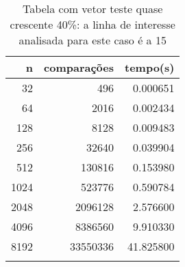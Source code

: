 \begin{table}[ht]
\centering
\begin{tabular}{rrr} \toprule
        n &    comparações &       tempo(s) \\ \midrule
      32  &            496 &      0.000651 \\
      64  &           2016 &      0.002434 \\
     128  &           8128 &      0.009483 \\
     256  &          32640 &      0.039904 \\
     512  &         130816 &      0.153980 \\
    1024  &         523776 &      0.590784 \\
    2048  &        2096128 &      2.576600 \\
    4096  &        8386560 &      9.910330 \\
    8192  &       33550336 &     41.825800 \\
\bottomrule\addlinespace
\end{tabular}
\caption{Tabela com vetor teste quase crescente 40\%: a linha de interesse analisada para este caso é a 15}
\label{tab:bolhaQuaseCresc40}
\end{table}
